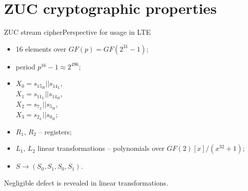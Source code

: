 \documentclass[10pt, ucs]{beamer}
\begin{document}
\section{ZUC cryptographic properties}
\begin{frame}{ZUC stream cipher}{Perspective for usage in LTE}
    \begin{minipage}{0.4 \textwidth}
        \begin{itemize}
            \item 16 elements over {\small $GF(p) = GF(2^{31}-1)$};
            \item period $p^{16} -1 \approx 2^{496}$;
            \item $X_0 = s_{15_H} || s_{14_L}$,  \\
                $X_1 = s_{11_L} || s_{14_H}$,  \\
                $X_2 = s_{7_L} || s_{5_H}$,  \\
                $X_3 = s_{2_L} || s_{0_H}$;
            \item $R_1$, $R_2$ -- registers;
            \item $L_1$, $L_2$
                linear transformations --
                polynomials over $GF(2)[x]/(x^{32}+1)$;
            \item $S \rightarrow (S_0, S_1, S_0, S_1)$.
        \end{itemize}
        \begin{block}{}
            Negligible defect is revealed in linear transformations.
        \end{block}
    \end{minipage}%
        \hspace*{1.6ex}%
    \begin{minipage}{0.6 \textwidth}
        
    \end{minipage}
\end{frame}
\end{document}
